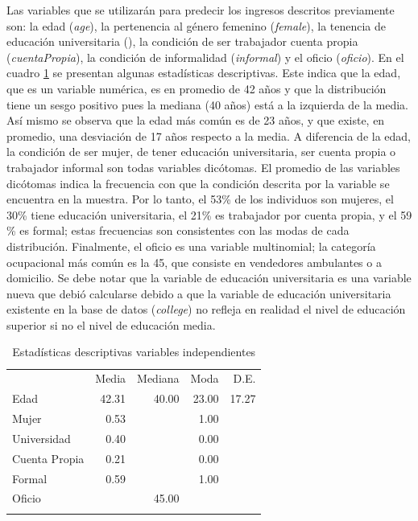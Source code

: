 \documentclass[11pt,a4paper]{article}
\begin{document}
 Las variables que se utilizarán para predecir los ingresos descritos previamente son: la edad (\textit{age}), la pertenencia al género femenino (\textit{female}), la tenencia de educación universitaria (), la condición de ser trabajador cuenta propia (\textit{cuentaPropia}), la condición de informalidad (\textit{informal})  y el oficio (\textit{oficio}). 
 En el cuadro \ref{tbl:estadisticasDescInd} se presentan algunas estadísticas descriptivas. Este indica que la edad, que es un variable numérica, es en promedio de 42 años y que la distribución tiene un sesgo positivo pues la mediana (40 años) está a la izquierda de la media. Así mismo se observa que la edad más común es de 23 años, y que existe, en promedio, una desviación de 17 años respecto a la media. 
A diferencia de la edad, la condición de ser mujer, de tener educación universitaria, ser cuenta propia o trabajador informal son todas variables dicótomas. El promedio de las variables dicótomas indica la frecuencia con que la condición descrita por la variable se encuentra en la muestra. Por lo tanto, el 53\% de los individuos son mujeres, el 30\% tiene educación universitaria, el 21\% es trabajador por cuenta propia, y el 59 \% es formal; estas frecuencias son consistentes con las modas de cada distribución. 
Finalmente, el oficio es una variable multinomial; la categoría ocupacional más común es la 45, que consiste en vendedores ambulantes o a domicilio. Se debe notar que la variable de educación universitaria es una variable nueva que debió calcularse debido a que la variable de educación universitaria existente en la base de datos (\textit{college}) no refleja en realidad el nivel de educación superior si no el nivel de educación media. 

\begin{table}[htp]
  \centering
  \caption{Estadísticas descriptivas variables independientes} 
  \label{tab:descriptive_independent}
  \begingroup\fontsize{9pt}{10pt}\selectfont
  \begin{tabular}{lrrrr}
    \hline
  \addlinespace
    & Media & Mediana & Moda & D.E. \\
  \addlinespace
   \hline
   Edad & 42.31 & 40.00 & 23.00 & 17.27 \\ 
    Mujer & 0.53 &  & 1.00 &  \\ 
    Universidad & 0.40 &  & 0.00 &  \\ 
    Cuenta Propia & 0.21 & & 0.00 &  \\ 
    Formal & 0.59 & & 1.00 & \\ 
    Oficio &  & 45.00 & &  \\ 
     \addlinespace
  \hline
  \addlinespace
  \end{tabular}
  \endgroup
  \label{tbl:estadisticasDescInd}
  \end{table}
  
\end{document}
